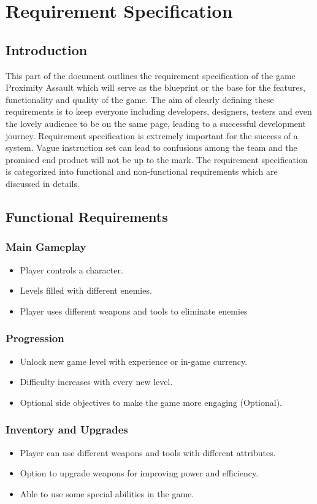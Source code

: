 \chapter{Requirement Specification}
\section{Introduction}
This part of the document outlines the requirement specification of the game Proximity Assault which will serve as the blueprint or the base for the features, functionality and quality of the game. The aim of clearly defining these requirements is to keep everyone including developers, designers, testers and even the lovely audience to be on the same page, leading to a successful development journey.
Requirement specification is extremely important for the success of a system. Vague instruction set can lead to confusions among the team and the promised end product will not be up to the mark.
The requirement specification is categorized into functional and non-functional requirements which are discussed in details.
\section{Functional Requirements}
\subsection{Main Gameplay}
\begin{itemize}
\item	Player controls a character.
\item 	Levels filled with different enemies.
\item 	Player uses different weapons and tools to eliminate enemies
\end{itemize}
\subsection{Progression}
\begin{itemize}
	\item 	Unlock new game level with experience or in-game currency.
	\item 	Difficulty increases with every new level.
	\item	Optional side objectives to make the game more engaging (Optional).
\end{itemize}
\subsection{Inventory and Upgrades}
\begin{itemize}
	\item 	Player can use different weapons and tools with different attributes.
	\item 	Option to upgrade weapons for improving power and efficiency.
	\item 	Able to use some special abilities in the game.
\end{itemize}
